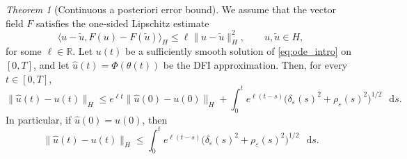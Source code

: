 \documentclass[oneside,11pt]{article}
\theoremstyle{remark}
\theoremstyle{thmstyleone}
\newtheorem{theorem}{Theorem}[section]
\theoremstyle{thmstylethree}
\theoremstyle{thmstyletwo}
\newcommand{\R}{\mathbb{R}}
\newcommand{\ip}[2]{\langle #1,#2\rangle}
\newcommand{\norm}[1]{\lVert #1\rVert}
\newcommand*\dif{\mathop{}\!\mathrm{d}}
\begin{document}
        
   \begin{theorem}[Continuous a posteriori error bound]
          \label{thm:continuous_aposteriori}We assume that the vector field $F$ satisfies the one-sided Lipschitz estimate
        \begin{equation}
          \ip{u-\widetilde u}{F(u)-F(\widetilde u)}_H
          \le
          \ell \norm{u-\widetilde u}_H^2,
          \qquad u,\widetilde u\in H,
          \label{eq:one_sided_lipschitz_cont}
        \end{equation}
        for some $\ell\in\R$.
          Let $u(t)$ be a sufficiently smooth solution of \eqref{eq:ode_intro} on $[0,T]$, and let $\hat u(t)=\Phi(\theta(t))$ be the DFI approximation. 
          Then, for every $t\in[0,T]$,
          \begin{equation}
            \norm{\hat u(t)-u(t)}_H
            \le
            e^{\ell t}\norm{\hat u(0)-u(0)}_H
            +
            \int_0^t e^{\ell(t-s)}
            \bigl(\delta_\varepsilon(s)^2+\rho_\varepsilon(s)^2\bigr)^{1/2}\,\dif s.
            \label{eq:continuous_aposteriori_bound}
          \end{equation}
          In particular, if $\hat u(0)=u(0)$, then
          \begin{equation}
            \norm{\hat u(t)-u(t)}_H
            \le
            \int_0^t e^{\ell(t-s)}
            \bigl(\delta_\varepsilon(s)^2+\rho_\varepsilon(s)^2\bigr)^{1/2}\,\dif s.
            \label{eq:continuous_aposteriori_exact_data}
          \end{equation}
        \end{theorem}
\end{document}
